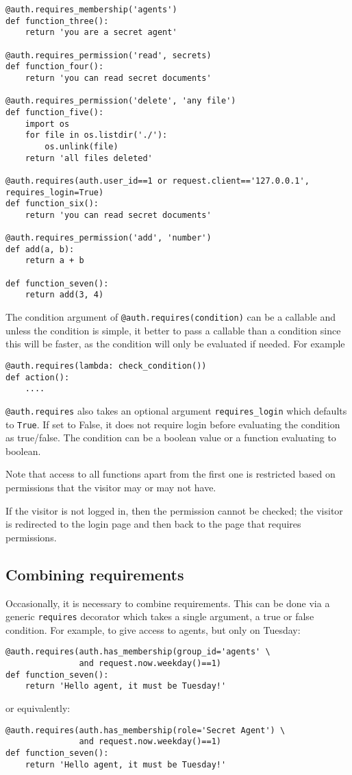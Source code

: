 \documentclass[justified,sixbynine,notoc]{tufte-book}
\def\ft{\small\tt}
\begin{document}
\begin{fullwidth}
\begin{lstlisting}
@auth.requires_membership('agents')
def function_three():
    return 'you are a secret agent'

@auth.requires_permission('read', secrets)
def function_four():
    return 'you can read secret documents'

@auth.requires_permission('delete', 'any file')
def function_five():
    import os
    for file in os.listdir('./'):
        os.unlink(file)
    return 'all files deleted'

@auth.requires(auth.user_id==1 or request.client=='127.0.0.1', requires_login=True)
def function_six():
    return 'you can read secret documents'

@auth.requires_permission('add', 'number')
def add(a, b):
    return a + b

def function_seven():
    return add(3, 4)
\end{lstlisting}

The condition argument of {\ft @auth.requires(condition)} can be a callable and unless the condition is simple, it better to pass a callable than a condition since this will be faster, as the condition will only be evaluated if needed. For example

\begin{lstlisting}
@auth.requires(lambda: check_condition())
def action():
    ....
\end{lstlisting}

{\ft @auth.requires} also takes an optional argument {\ft requires\_login} which defaults to {\ft True}. If set to False, it does not require login before evaluating the condition as true/false. The condition can be a boolean value or a function evaluating to boolean.

Note that access to all functions apart from the first one is restricted based on permissions that the visitor may or may not have.

If the visitor is not logged in, then the permission cannot be checked; the visitor is redirected to the login page and then back to the page that requires permissions.

\goodbreak\subsection{Combining requirements}

Occasionally, it is necessary to combine requirements. This can be done via a generic {\ft requires} decorator which takes a single argument, a true or false condition. For example, to give access to agents, but only on Tuesday:
\begin{lstlisting}
@auth.requires(auth.has_membership(group_id='agents' \
               and request.now.weekday()==1)
def function_seven():
    return 'Hello agent, it must be Tuesday!'
\end{lstlisting}
\noindent or equivalently:
\begin{lstlisting}
@auth.requires(auth.has_membership(role='Secret Agent') \
               and request.now.weekday()==1)
def function_seven():
    return 'Hello agent, it must be Tuesday!'
\end{lstlisting}


\end{fullwidth}
\end{document}
